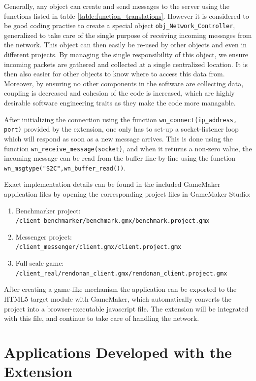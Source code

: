 \documentclass[bsc, 12pt, twoside, singlespacing, parskip, abbrevs, notimes, normalheadings, logo]{styles/infthesis}
\begin{document}
Generally, any object can create and send messages to the server using the functions listed in table \ref{table:function_translations}. However it is considered to be good coding practise to create a special object \texttt{obj\_Network\_Controller}, generalized to take care of the single purpose of receiving incoming messages from the network. This object can then easily be re-used by other objects and even in different projects. By managing the single responsibility of this object, we ensure incoming packets are gathered and collected at a single centralized location. It is then also easier for other objects to know where to access this data from. Moreover, by ensuring no other components in the software are collecting data, coupling is decreased and cohesion of the code is increased, which are highly desirable software engineering traits as they make the code more managable.

After initializing the connection using the function \texttt{wn\_connect(ip\_address, port)} provided by the extension, one only has to set-up a socket-listener loop which will respond as soon as a new message arrives. This is done using the function \texttt{wn\_receive\_message(socket)}, and when it returns a non-zero value, the incoming message can be read from the buffer line-by-line using the function \texttt{wn\_msgtype("S2C",wn\_buffer\_read())}.

Exact implementation details can be found in the included GameMaker application files by opening the corresponding project files in GameMaker Studio: 
\begin{enumerate}
\item Benchmarker project:\\ \texttt{/client\_benchmarker/benchmark.gmx/benchmark.project.gmx}
\item Messenger project:\\ \texttt{/client\_messenger/client.gmx/client.project.gmx}
\item Full scale game:\\ \texttt{/client\_real/rendonan\_client.gmx/rendonan\_client.project.gmx}
\end{enumerate}

After creating a game-like mechanism the application can be exported to the HTML5 target module with GameMaker, which automatically converts the project into a browser-executable javascript file. The extension will be integrated with this file, and continue to take care of handling the network.

\section{Applications Developed with the Extension}
\end{document}
